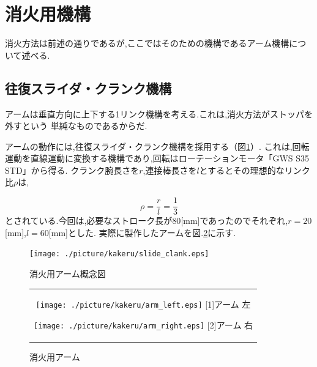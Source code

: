 \documentclass[11pt,a4]{jsarticle}
\begin{document}

\section{消火用機構} 
消火方法は前述の通りであるが,ここではそのための機構であるアーム機構について述べる.

\subsection{往復スライダ・クランク機構}
アームは垂直方向に上下する1リンク機構を考える.これは,消火方法がストッパを外すという
単純なものであるからだ.

アームの動作には,往復スライダ・クランク機構を採用する（図\ref{arm_con}）.
これは,回転運動を直線運動に変換する機構であり,回転はローテーションモータ「GWS S35 STD」から得る.
クランク腕長さを$r$,連接棒長さを$l$とするとその理想的なリンク比$\rho$は,

\begin{equation}
	\rho = \frac{r}{l}=\frac{1}{3}
\end{equation}
とされている.今回は,必要なストローク長が$80$[mm]であったのでそれぞれ,$r=20$[mm],$l=60$[mm]とした.
実際に製作したアームを図.\ref{arm_real}に示す.

\begin{figure}[h]
 \centering
   \texttt{[image: ./picture/kakeru/slide\_clank.eps]}
   \caption{消火用アーム概念図}
 \label{arm_con}
\end{figure}

\begin{figure}[h]
 \centering
 \begin{tabular}{c}

  \begin{minipage}{0.3\hsize}
   \centering
   \texttt{[image: ./picture/kakeru/arm\_left.eps]}
   \hspace{1.6cm} [1]アーム 左
  \end{minipage}

  \begin{minipage}{0.45\hsize}
   \centering
   \texttt{[image: ./picture/kakeru/arm\_right.eps]}
   \hspace{1.6cm} [2]アーム 右
  \end{minipage}
 \end{tabular}
 \caption{消火用アーム}
 \label{arm_real}
\end{figure}

\newpage
\end{document}
